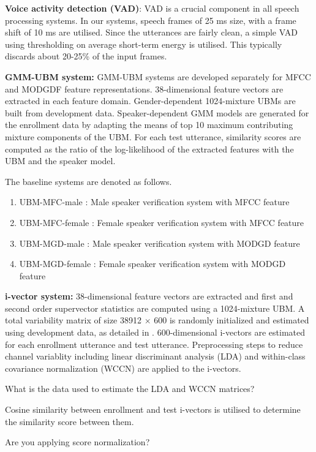 \documentclass{article}
\begin{document}
\textbf{Voice activity detection (VAD)}: VAD is a crucial component in all
speech processing systems. In our systems, speech frames of 25 ms size, with
a frame shift of 10 ms are utilised. Since the utterances are fairly clean, a simple
VAD using thresholding on average short-term energy is utilised. This typically
discards about 20-25\% of the input frames.

\textbf{GMM-UBM system:} GMM-UBM systems are developed separately for MFCC and
 MODGDF feature representations. 38-dimensional feature vectors are
extracted in each feature domain. Gender-dependent 1024-mixture UBMs are built
from development data.  Speaker-dependent GMM models are generated for the
enrollment data by adapting the means of top 10 maximum contributing mixture
components of the UBM. For each test utterance, similarity scores are computed
as the ratio of the log-likelihood of the extracted features with
the UBM and the speaker model.

The baseline systems are denoted as follows.
\begin{enumerate}
\item UBM-MFC-male : Male speaker verification system with MFCC feature
\item UBM-MFC-female : Female speaker verification system with MFCC feature
\item UBM-MGD-male : Male speaker verification system with MODGD feature
\item UBM-MGD-female : Female speaker verification system with MODGD feature
\end{enumerate}

\textbf{i-vector system:} 
38-dimensional feature vectors are extracted and first and second order
supervector statistics are computed using a 1024-mixture UBM. A total
variability matrix of size 38912 $\times$ 600 is randomly initialized and
estimated using development data, as detailed in \cite{dehak_ivector,
kenny_JFA}. 600-dimensional i-vectors are estimated for each enrollment
utterance and test utterance. Preprocessing steps to reduce channel variablity including linear
discriminant analysis (LDA) and within-class covariance normalization (WCCN) are
applied to the i-vectors.

What is the data used to estimate the LDA and WCCN matrices?

Cosine similarity between enrollment and test i-vectors is utilised to determine
the similarity score between them.

Are you applying score normalization?
\end{document}
